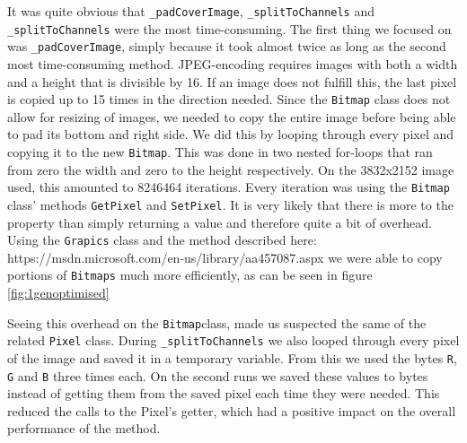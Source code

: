 It was quite obvious that \lstinline|_padCoverImage|, \lstinline|_splitToChannels| and \lstinline|_splitToChannels| were the most time-consuming.
The first thing we focused on was \lstinline|_padCoverImage|, simply because it took almost twice as long as the second most time-consuming method.
JPEG-encoding requires images with both a width and a height that is divisible by 16.
If an image does not fulfill this, the last pixel is copied up to 15 times in the direction needed.
Since the \lstinline|Bitmap| class does not allow for resizing of images, we needed to copy the entire image before being able to pad its bottom and right side.
We did this by looping through every pixel and copying it to the new \lstinline|Bitmap|.
This was done in two nested for-loops that ran from zero the width and zero to the height respectively.
On the 3832x2152 image used, this amounted to 8246464 iterations. 
Every iteration was using the \lstinline|Bitmap| class' methods \lstinline|GetPixel| and \lstinline|SetPixel|.
It is very likely that there is more to the property than simply returning a value and therefore quite a bit of overhead.
Using the \lstinline|Grapics| class and the method described here: https://msdn.microsoft.com/en-us/library/aa457087.aspx we were able to copy portions of \lstinline|Bitmaps| much more efficiently, as can be seen in figure \ref{fig:1genoptimised}

Seeing this overhead on the \lstinline|Bitmap|class, made us suspected the same of the related \lstinline|Pixel| class. 
During \lstinline|_splitToChannels| we also looped through every pixel of the image and saved it in a temporary variable. 
From this we used the bytes \lstinline|R|, \lstinline|G| and \lstinline|B| three times each. 
On the second runs we saved these values to bytes instead of getting them from the saved pixel each time they were needed.
This reduced the calls to the Pixel's getter, which had a positive impact on the overall performance of the method.

